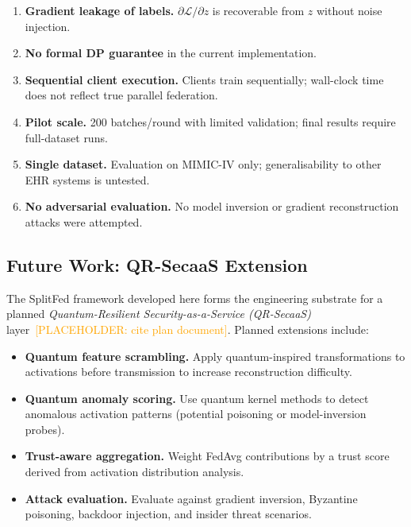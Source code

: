 \documentclass[10pt,twocolumn]{article}
\newcommand{\placeholder}[1]{\textcolor{orange}{[PLACEHOLDER: #1]}}
\begin{document}
\begin{enumerate}[leftmargin=*, label=\textbf{L\arabic*.}]
  \item \textbf{Gradient leakage of labels.}  $\partial\mathcal{L}/\partial z$
        is recoverable from $z$ without noise injection.
  \item \textbf{No formal DP guarantee} in the current implementation.
  \item \textbf{Sequential client execution.}  Clients train
        sequentially; wall-clock time does not reflect true parallel
        federation.
  \item \textbf{Pilot scale.}  200 batches/round with limited
        validation; final results require full-dataset runs.
  \item \textbf{Single dataset.}  Evaluation on MIMIC-IV only;
        generalisability to other EHR systems is untested.
  \item \textbf{No adversarial evaluation.}  No model inversion or
        gradient reconstruction attacks were attempted.
\end{enumerate}

\subsection{Future Work: QR-SecaaS Extension}

The SplitFed framework developed here forms the engineering substrate
for a planned \emph{Quantum-Resilient Security-as-a-Service
(QR-SecaaS)} layer~\placeholder{cite plan document}.  Planned
extensions include:
\begin{itemize}[leftmargin=*]
  \item \textbf{Quantum feature scrambling.}  Apply quantum-inspired
        transformations to activations before transmission to increase
        reconstruction difficulty.
  \item \textbf{Quantum anomaly scoring.}  Use quantum kernel methods
        to detect anomalous activation patterns (potential poisoning or
        model-inversion probes).
  \item \textbf{Trust-aware aggregation.}  Weight FedAvg contributions
        by a trust score derived from activation distribution analysis.
  \item \textbf{Attack evaluation.}  Evaluate against gradient
        inversion, Byzantine poisoning, backdoor injection, and insider
        threat scenarios.
\end{itemize}

\end{document}
